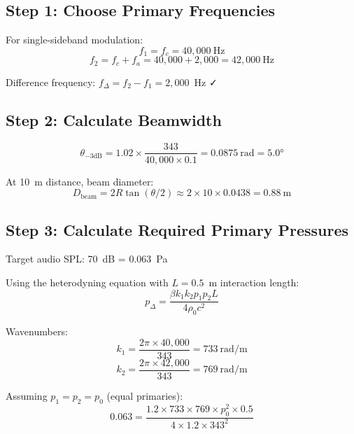 \subsection*{Step 1: Choose Primary Frequencies}

For single-sideband modulation:
\begin{equation}
f_1 = f_c = 40{,}000~\text{Hz}
\end{equation}
\begin{equation}
f_2 = f_c + f_a = 40{,}000 + 2{,}000 = 42{,}000~\text{Hz}
\end{equation}

Difference frequency: $f_\Delta = f_2 - f_1 = 2{,}000$~Hz ✓

\subsection*{Step 2: Calculate Beamwidth}

\begin{equation}
\theta_{-3\text{dB}} = 1.02 \times \frac{343}{40{,}000 \times 0.1} = 0.0875~\text{rad} = 5.0°
\end{equation}

At 10~m distance, beam diameter:
\begin{equation}
D_{\text{beam}} = 2R\tan(\theta/2) \approx 2 \times 10 \times 0.0438 = 0.88~\text{m}
\end{equation}

\subsection*{Step 3: Calculate Required Primary Pressures}

Target audio SPL: 70~dB = 0.063~Pa

Using the heterodyning equation with $L = 0.5$~m interaction length:
\begin{equation}
p_\Delta = \frac{\beta k_1 k_2 p_1 p_2 L}{4\rho_0 c^2}
\end{equation}

Wavenumbers:
\begin{equation}
k_1 = \frac{2\pi \times 40{,}000}{343} = 733~\text{rad/m}
\end{equation}
\begin{equation}
k_2 = \frac{2\pi \times 42{,}000}{343} = 769~\text{rad/m}
\end{equation}

Assuming $p_1 = p_2 = p_0$ (equal primaries):
\begin{equation}
0.063 = \frac{1.2 \times 733 \times 769 \times p_0^2 \times 0.5}{4 \times 1.2 \times 343^2}
\end{equation}

